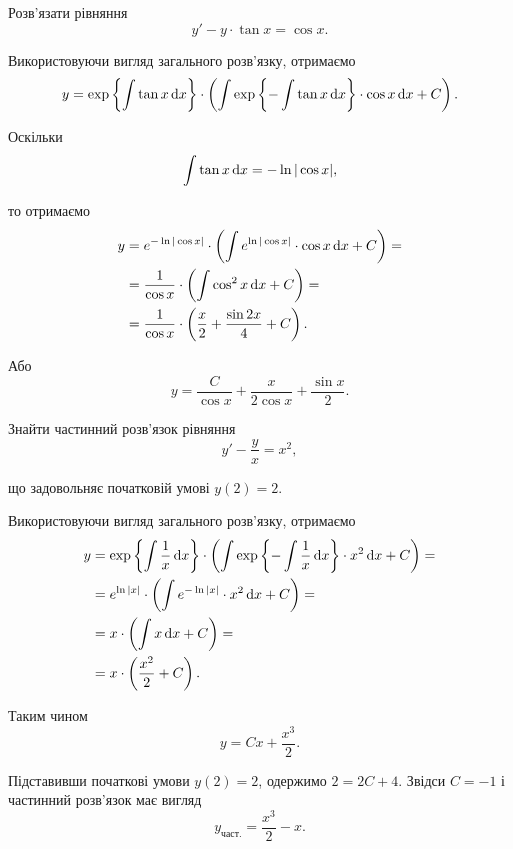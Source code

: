 \begin{example}
	Розв'язати рівняння \[ y' - y \cdot \tan x = \cos x.\]
\end{example}

\begin{solution}
	Використовуючи вигляд загального розв'язку, отримаємо \[ y = \exp\left\{\int \tan x \mathop{}\!\mathrm{d} x\right\} \cdot \left(\int \exp\left\{-\int\tan x\mathop{}\!\mathrm{d} x\right\} \cdot \cos x \mathop{}\!\mathrm{d} x + C \right). \]

	Оскільки \[\int \tan x \mathop{}\!\mathrm{d} x = - \ln |\cos x|,\] 

	то отримаємо
	\begin{align*}
		y &= e^{-\ln|\cos x|} \cdot \left(\int e^{\ln|\cos x|} \cdot \cos x \mathop{}\!\mathrm{d} x+C\right) = \\
		&= \frac{1}{\cos x} \cdot \left( \int \cos^2 x \mathop{}\!\mathrm{d} x + C \right) = \\
		&= \frac{1}{\cos x} \cdot \left( \frac x2 + \frac{\sin 2x}{4} + C \right).
	\end{align*}
	
	Або
	\[ y = \frac{C}{\cos x} + \frac{x}{2 \cos x} + \frac{\sin x}{2}. \]
\end{solution}

\begin{example}
	Знайти частинний розв'язок рівняння \[ y' - \frac yx = x^2,\] 

	що задовольняє початковій умові $y(2) = 2$.
\end{example}

\begin{solution}
	Використовуючи вигляд загального розв'язку, отримаємо
	\begin{align*}
		y &= \exp\left\{\int \frac1x \mathop{}\!\mathrm{d} x\right\} \cdot \left(\int \exp\left\{-\int\frac1x\mathop{}\!\mathrm{d} x\right\}\cdot x^2 \mathop{}\!\mathrm{d} x+C\right) = \\
		&= e^{\ln|x|} \cdot \left(\int e^{-\ln|x|} \cdot x^2 \mathop{}\!\mathrm{d} x+C\right) = \\
		&= x \cdot \left(\int x \mathop{}\!\mathrm{d} x+C\right) = \\
		&= x \cdot \left(\frac{x^2}{2} + C\right).
	\end{align*}

	Таким чином \[ y = C x + \frac{x^3}{2}.\]
	
	Підставивши початкові умови $y(2) = 2$, одержимо $2 = 2C + 4$. Звідси $C = -1$ і частинний розв'язок має вигляд \[ y_{\text{част.}} = \frac{x^3}{2} - x.\]
\end{solution}

